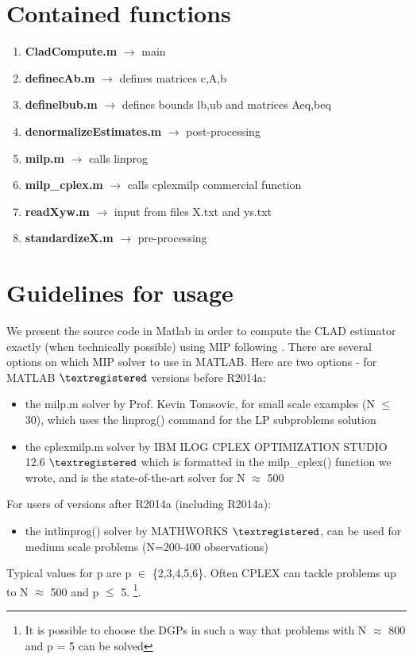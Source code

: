 \documentclass[12pt]{article}
\begin{document}
\section{Contained functions} \label{Sec:Contents}

\begin{enumerate}
\item \textbf{CladCompute.m}  $\rightarrow$  main
\item \textbf{definecAb.m}       $\rightarrow$  defines matrices c,A,b
\item \textbf{definelbub.m}      $\rightarrow$ defines bounds lb,ub and matrices Aeq,beq
\item \textbf{denormalizeEstimates.m}  $\rightarrow$ post-processing
\item \textbf{milp.m}  $\rightarrow$ calls linprog
\item \textbf{milp\_cplex.m} $\rightarrow$ calls cplexmilp commercial function
\item \textbf{readXyw.m}  $\rightarrow$ input from files X.txt and ys.txt
\item \textbf{standardizeX.m} $\rightarrow$ pre-processing
\end{enumerate}

\section{Guidelines for usage} \label{Sec:Guidelines}

We present the source code in Matlab in order to compute the CLAD estimator exactly (when technically possible) using MIP following \cite{Bilias:13}.
There are several options on which MIP solver to use in MATLAB.
Here are two options - for MATLAB $\textregistered$ versions before R2014a:

\begin{itemize}
\item 
the milp.m solver by Prof. Kevin Tomsovic, for small scale examples (N $\leq$ 30), 
which uses the linprog() command for the LP subproblems solution

\item
the cplexmilp.m solver by IBM ILOG CPLEX OPTIMIZATION STUDIO 12.6 $\textregistered$  which is formatted in the milp\_cplex() function we wrote,
and is the state-of-the-art solver for N $\approx$ 500
\end{itemize}

For users of versions after R2014a (including R2014a):

\begin{itemize}
\item 
the intlinprog() solver by MATHWORKS $\textregistered$, can be used for medium scale problems (N=200-400 observations)
\end{itemize}

Typical values for p are p $\in$ \{2,3,4,5,6\}. Often CPLEX can tackle problems up to N  $\approx$ 500 and p $\leq$ 5.
\footnote{It is possible to choose the DGPs in such a way that problems with N $\approx$ 800 and p = 5 can be solved}.


\end{document}
